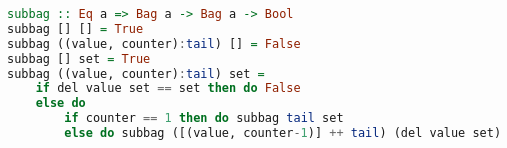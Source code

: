 \begin{lstlisting}[language=haskell]
subbag :: Eq a => Bag a -> Bag a -> Bool
subbag [] [] = True
subbag ((value, counter):tail) [] = False
subbag [] set = True
subbag ((value, counter):tail) set = 
    if del value set == set then do False
    else do
        if counter == 1 then do subbag tail set
        else do subbag ([(value, counter-1)] ++ tail) (del value set)
\end{lstlisting}